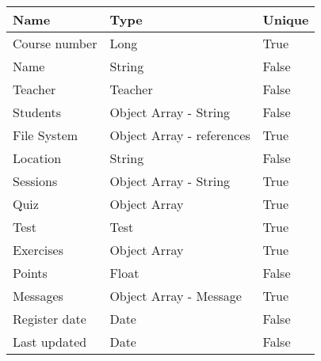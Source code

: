 \documentclass[12pt,a4paper]{article}
\begin{document}
    \begin{table}[h]
        \centering
        \begin{tabular}{|l|l|l|}
            \hline
            \textbf{Name} & \textbf{Type} & \textbf{Unique} \\
            \hline
            Course number & Long & True \\
            \hline
            Name & String & False \\
            \hline
            Teacher & Teacher & False \\
            \hline
            Students & Object Array - String & False \\
            \hline
            File System & Object Array - references & True \\
            \hline
            Location & String & False \\
            \hline
            Sessions & Object Array - String & True \\
            \hline
            Quiz & Object Array & True \\
            \hline
            Test & Test & True \\
            \hline
            Exercises & Object Array & True \\
            \hline
            Points & Float & False \\
            \hline
            Messages & Object Array - Message & True \\
            \hline
            Register date & Date & False \\
            \hline
            Last updated & Date & False \\
            \hline
        \end{tabular}
    \end{table}
\end{document}
